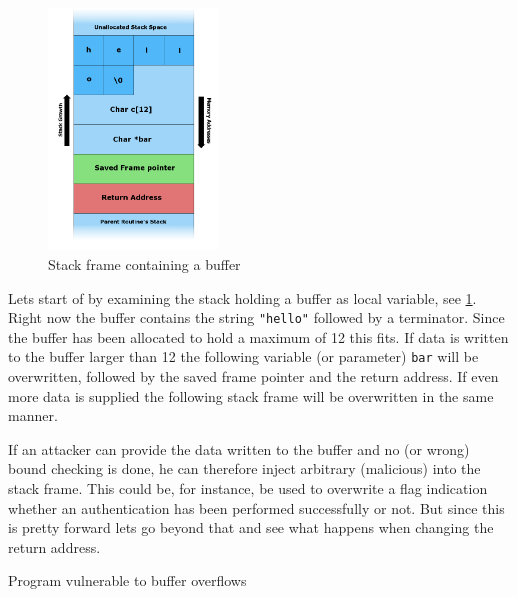 \documentclass[article]{uibk}
\begin{document}
\begin{figure}[H]
    \centering
    \includegraphics[width=0.4\textwidth]{gfx/stack_smash.png}
    \caption{Stack frame containing a buffer}
    \label{fig:stack_frame}
\end{figure}

Lets start of by examining the stack holding a buffer as local variable, see
\cref{fig:stack_frame}. Right now the buffer contains the string
\texttt{"hello"} followed by a terminator. Since the buffer has been allocated
to hold a maximum of \SI{12}{\byte} this fits. If data is written to the buffer
larger than \SI{12}{\byte} the following variable (or parameter) \texttt{bar}
will be overwritten, followed by the saved frame pointer and the return
address. If even more data is supplied the following stack frame will be
overwritten in the same manner.

If an attacker can provide the data written to the buffer and no (or wrong)
bound checking is done, he can therefore inject arbitrary (malicious) into the
stack frame. This could be, for instance, be used to overwrite a flag
indication whether an authentication has been performed successfully or not.
But since this is pretty forward lets go beyond that and see what happens when
changing the return address.

\begin{listing}[h!]
    \begin{minipage}[t]{0.4\textwidth}
    \end{minipage}\hfill
    \begin{minipage}[t]{0.5\textwidth}
    \end{minipage}
    \caption{Program vulnerable to buffer overflows}
    \label{src:buffer_overflow}
\end{listing}
\end{document}
